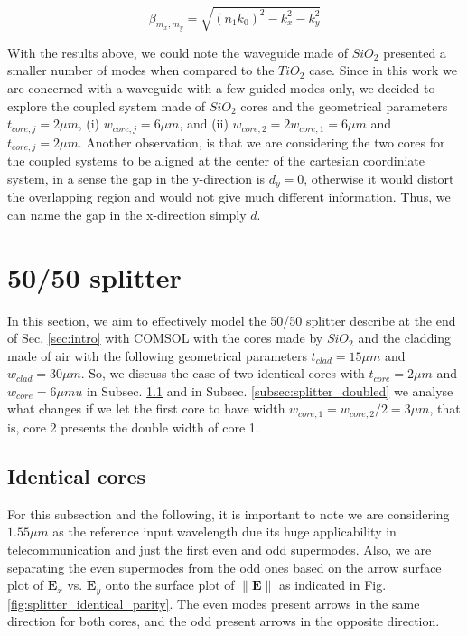\documentclass[conference, a4paper]{IEEEtran}
\begin{document}
\begin{equation}
    \beta_{m_x, m_y} = \sqrt{(n_1 k_0)^2 - k_x^2 - k_y^2}
    \label{eq:intro_rectangle}
\end{equation}

With the results above, we could note the waveguide made of $SiO_2$ presented a smaller number of modes when compared to the $TiO_2$ case. Since in this work we are concerned with a waveguide with a few guided modes only, we decided to explore the coupled system made of $SiO_2$ cores and the geometrical parameters $t_{core,j} = 2\mu m$, (i) $w_{core, j} = 6 \mu m$, and (ii) $w_{core, 2} = 2 w_{core, 1} = 6\mu m$ and $t_{core, j} = 2\mu m$. Another observation, is that we are considering the two cores for the coupled systems to be aligned at the center of the cartesian coordiniate system, in a sense the gap in the y-direction is $d_y = 0$, otherwise it would distort the overlapping region and would not give much different information. Thus, we can name the gap in the x-direction simply $d$.

\section{50/50 splitter}
\label{sec:splitter}

In this section, we aim to effectively model the 50/50 splitter describe at the end of Sec. \ref{sec:intro} with COMSOL with the cores made by $SiO_2$ and the cladding made of air with the following geometrical parameters $t_{clad} = 15\mu m$ and $w_{clad} = 30\mu m$. So, we discuss the case of two identical cores with $t_{core} = 2\mu m$ and $w_{core} = 6\mu mu$ in Subsec. \ref{subsec:splitter_identical} and in Subsec. \ref{subsec:splitter_doubled} we analyse what changes if we let the first core to have width $w_{core, 1} = w_{core, 2}/2 = 3\mu m$, that is, core 2 presents the double width of core 1.
    
\subsection{Identical cores}
\label{subsec:splitter_identical}

For this subsection and the following, it is important to note we are considering $1.55\mu m$ as the reference input wavelength due its huge applicability in telecommunication and just the first even and odd supermodes. Also, we are separating the even supermodes from the odd ones based on the arrow surface plot of $\mathbf{E}_x$ vs. $\mathbf{E}_y$ onto the surface plot of $\| \mathbf{E} \|$ as indicated in Fig. \ref{fig:splitter_identical_parity}. The even modes present arrows in the same direction for both cores, and the odd present arrows in the opposite direction.
\end{document}
